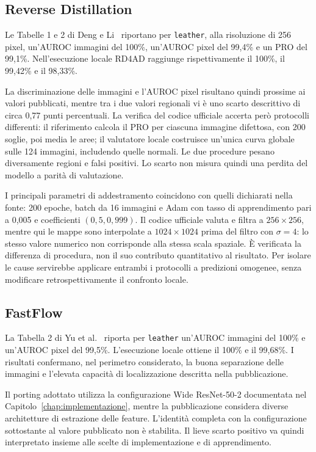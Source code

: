 \subsection{Reverse Distillation}

Le Tabelle 1 e 2 di Deng e Li~\cite{Deng_et_al._2022} riportano per \texttt{leather}, alla risoluzione di 256 pixel, un'AUROC immagini del 100\%, un'AUROC pixel del 99,4\% e un PRO del 99,1\%. Nell'esecuzione locale RD4AD raggiunge rispettivamente il 100\%, il 99,42\% e il 98,33\%.

La discriminazione delle immagini e l'AUROC pixel risultano quindi prossime ai valori pubblicati, mentre tra i due valori regionali vi è uno scarto descrittivo di circa 0,77 punti percentuali. La verifica del codice ufficiale \cite{Deng_RD4AD_code_2022} accerta però protocolli differenti: il riferimento calcola il PRO per ciascuna immagine difettosa, con 200 soglie, poi media le aree; il valutatore locale costruisce un'unica curva globale sulle 124 immagini, includendo quelle normali. Le due procedure pesano diversamente regioni e falsi positivi. Lo scarto non misura quindi una perdita del modello a parità di valutazione.

I principali parametri di addestramento coincidono con quelli dichiarati nella fonte: 200 epoche, batch da 16 immagini e Adam con tasso di apprendimento pari a 0,005 e coefficienti $(0{,}5,0{,}999)$. Il codice ufficiale valuta e filtra a $256\times256$, mentre qui le mappe sono interpolate a $1024\times1024$ prima del filtro con $\sigma=4$: lo stesso valore numerico non corrisponde alla stessa scala spaziale. È verificata la differenza di procedura, non il suo contributo quantitativo al risultato. Per isolare le cause servirebbe applicare entrambi i protocolli a predizioni omogenee, senza modificare retrospettivamente il confronto locale.

\subsection{FastFlow}

La Tabella 2 di Yu et al.~\cite{Yu_et_al._2021} riporta per \texttt{leather} un'AUROC immagini del 100\% e un'AUROC pixel del 99,5\%. L'esecuzione locale ottiene il 100\% e il 99,68\%. I risultati confermano, nel perimetro considerato, la buona separazione delle immagini e l'elevata capacità di localizzazione descritta nella pubblicazione.

Il porting adottato utilizza la configurazione Wide ResNet-50-2 documentata nel Capitolo~\ref{chap:implementazione}, mentre la pubblicazione considera diverse architetture di estrazione delle feature. L'identità completa con la configurazione sottostante al valore pubblicato non è stabilita. Il lieve scarto positivo va quindi interpretato insieme alle scelte di implementazione e di apprendimento.

